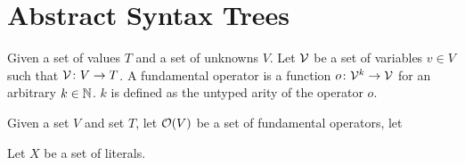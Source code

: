 \section{Abstract Syntax Trees}



\begin{definition}
  Given a set of values $T$ and a set of unknowns $V$. Let $\mathcal{V}$ be a set of
  variables $v \in V$ such that $\mathcal{V} \colon V \to T$. A fundamental operator is
  a function $o \colon \mathcal{V}^k \to \mathcal{V} $ for an arbitrary $k \in \mathbb{N}$.
  $k$ is defined as the untyped arity of the operator $o$.
\end{definition}

\begin{definition}[Sorts]
  Given a set $V$ and set $T$, let $\mathcal{O}(V)$ be a set of fundamental
  operators, let

\end{definition}

\begin{definition}
  Let $X$ be a set of literals.


\end{definition}

